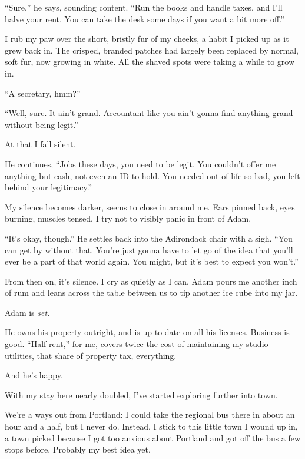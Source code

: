 ``Sure,'' he says, sounding content. ``Run the books and handle taxes, and I'll halve your rent. You can take the desk some days if you want a bit more off.''

I rub my paw over the short, bristly fur of my cheeks, a habit I picked up as it grew back in. The crisped, branded patches had largely been replaced by normal, soft fur, now growing in white. All the shaved spots were taking a while to grow in.

``A secretary, hmm?''

``Well, sure. It ain't grand. Accountant like you ain't gonna find anything grand without being legit.''

At that I fall silent.

He continues, ``Jobs these days, you need to be legit. You couldn't offer me anything but cash, not even an ID to hold. You needed out of life so bad, you left behind your legitimacy.''

My silence becomes darker, seems to close in around me. Ears pinned back, eyes burning, muscles tensed, I try not to visibly panic in front of Adam.

``It's okay, though.'' He settles back into the Adirondack chair with a sigh. ``You can get by without that. You're just gonna have to let go of the idea that you'll ever be a part of that world again. You might, but it's best to expect you won't.''

From then on, it's silence. I cry as quietly as I can. Adam pours me another inch of rum and leans across the table between us to tip another ice cube into my jar.

\secdiv{}

\noindent Adam is \emph{set.}

He owns his property outright, and is up-to-date on all his licenses. Business is good. ``Half rent,'' for me, covers twice the cost of maintaining my studio---utilities, that share of property tax, everything.

And he's happy.

\secdiv{}

\noindent With my stay here nearly doubled, I've started exploring further into town.

We're a ways out from Portland: I could take the regional bus there in about an hour and a half, but I never do. Instead, I stick to this little town I wound up in, a town picked because I got too anxious about Portland and got off the bus a few stops before. Probably my best idea yet.

